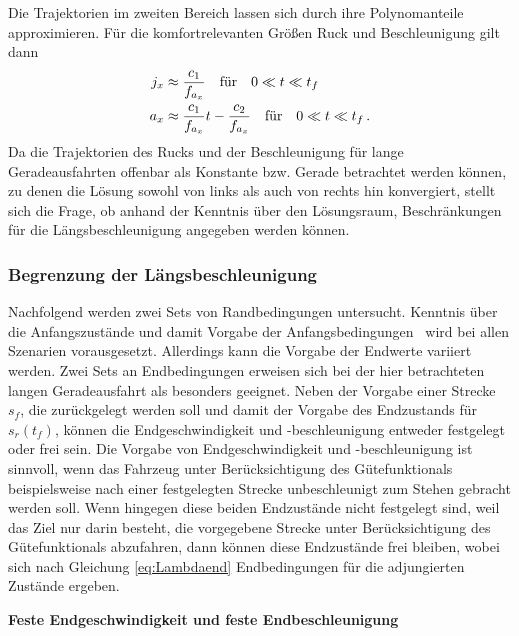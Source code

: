 Die Trajektorien im zweiten Bereich lassen sich durch ihre Polynomanteile approximieren. Für die komfortrelevanten Größen Ruck und Beschleunigung gilt dann
\begin{align}
j_x &\approx \frac{c_1}{f_{a_x}} \quad\textrm{für}\quad 0\ll t\ll t_f \label{eq:j_Bereich_2}
\\
a_x &\approx \frac{c_1}{f_{a_x}}t - \frac{c_2}{f_{a_x}} \quad\textrm{für}\quad 0\ll t\ll t_f\,. \label{eq:a_Bereich_2}
\end{align}
Da die Trajektorien des Rucks und der Beschleunigung für lange Geradeausfahrten offenbar als Konstante bzw. Gerade betrachtet werden können, zu denen die Lösung sowohl von links als auch von rechts hin konvergiert, stellt sich die Frage, ob anhand der Kenntnis über den Lösungsraum, Beschränkungen für die Längsbeschleunigung angegeben werden können. 

\subsubsection{Begrenzung der Längsbeschleunigung}
Nachfolgend werden zwei Sets von Randbedingungen untersucht. Kenntnis über die Anfangszustände und damit Vorgabe der Anfangsbedingungen \xzero~wird bei allen Szenarien vorausgesetzt. Allerdings kann die Vorgabe der Endwerte variiert werden. Zwei Sets an Endbedingungen erweisen sich bei der hier betrachteten langen Geradeausfahrt als besonders geeignet. Neben der Vorgabe einer Strecke $s_f$, die zurückgelegt werden soll und damit der Vorgabe des Endzustands für $s_r(t_f)$, können die Endgeschwindigkeit und -beschleunigung entweder festgelegt oder frei sein. Die Vorgabe von Endgeschwindigkeit und -beschleunigung ist sinnvoll, wenn das Fahrzeug unter Berücksichtigung des Gütefunktionals beispielsweise nach einer festgelegten Strecke unbeschleunigt zum Stehen gebracht werden soll. Wenn hingegen diese beiden Endzustände nicht festgelegt sind, weil das Ziel nur darin besteht, die vorgegebene Strecke unter Berücksichtigung des Gütefunktionals abzufahren, dann können diese Endzustände frei bleiben, wobei sich nach Gleichung \eqref{eq:Lambdaend} Endbedingungen für die adjungierten Zustände ergeben. 

\textbf{Feste Endgeschwindigkeit und feste Endbeschleunigung}

